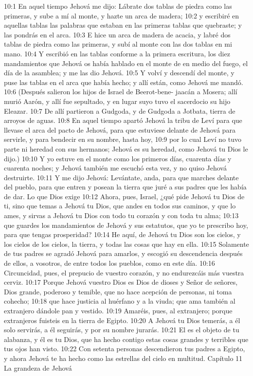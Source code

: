 10:1 En aquel tiempo Jehová me dijo: Lábrate dos tablas de piedra como las primeras, y sube a mí al monte, y hazte un arca de madera;  
10:2 y escribiré en aquellas tablas las palabras que estaban en las primeras tablas que quebraste; y las pondrás en el arca.  
10:3 E hice un arca de madera de acacia, y labré dos tablas de piedra como las primeras, y subí al monte con las dos tablas en mi mano.  
10:4 Y escribió en las tablas conforme a la primera escritura, los diez mandamientos que Jehová os había hablado en el monte de en medio del fuego, el día de la asamblea; y me las dio Jehová.  
10:5 Y volví y descendí del monte, y puse las tablas en el arca que había hecho; y allí están, como Jehová me mandó.  
10:6 (Después salieron los hijos de Israel de Beerot-bene- jaacán a Mosera; allí murió Aarón, y allí fue sepultado, y en lugar suyo tuvo el sacerdocio su hijo Eleazar.  
10:7 De allí partieron a Gudgoda, y de Gudgoda a Jotbata, tierra de arroyos de aguas.  
10:8 En aquel tiempo apartó Jehová la tribu de Leví  para que llevase el arca del pacto de Jehová, para que estuviese delante de Jehová para servirle, y para bendecir en su nombre, hasta hoy,  
10:9 por lo cual Leví no tuvo parte ni heredad con sus hermanos; Jehová es su heredad, como Jehová tu Dios le dijo.)  
10:10 Y yo estuve en el monte como los primeros días, cuarenta días y cuarenta noches; y Jehová también me escuchó esta vez, y no quiso Jehová destruirte.  
10:11 Y me dijo Jehová: Levántate, anda, para que marches delante del pueblo, para que entren y posean la tierra que juré a sus padres que les había de dar.  
Lo que Dios exige  
10:12 Ahora, pues, Israel, ¿qué pide Jehová tu Dios de ti, sino que temas a Jehová tu Dios, que andes en todos sus caminos, y que lo ames, y sirvas a Jehová tu Dios con todo tu corazón y con toda tu alma;  
10:13 que guardes los mandamientos de Jehová y sus estatutos, que yo te prescribo hoy, para que tengas prosperidad?  
10:14 He aquí, de Jehová tu Dios son los cielos, y los cielos de los cielos, la tierra, y todas las cosas que hay en ella.  
10:15 Solamente de tus padres se agradó Jehová para amarlos, y escogió su descendencia después de ellos, a vosotros, de entre todos los pueblos, como en este día.  
10:16 Circuncidad, pues, el prepucio de vuestro corazón, y no endurezcáis más vuestra cerviz.  
10:17 Porque Jehová vuestro Dios es Dios de dioses y Señor de señores, Dios grande, poderoso y temible, que no hace acepción de personas, ni toma cohecho;  
10:18 que hace justicia al huérfano y a la viuda; que ama también al extranjero dándole pan y vestido.  
10:19 Amaréis, pues, al extranjero; porque extranjeros fuisteis en la tierra de Egipto.  
10:20 A Jehová tu Dios temerás, a él solo servirás, a él seguirás, y por su nombre jurarás.  
10:21 El es el objeto de tu alabanza, y él es tu Dios, que ha hecho contigo estas cosas grandes y terribles que tus ojos han visto.  
10:22 Con setenta personas descendieron tus padres a Egipto, y ahora Jehová te ha hecho como las estrellas del cielo en multitud.  
Capítulo 11 
La grandeza de Jehová  

